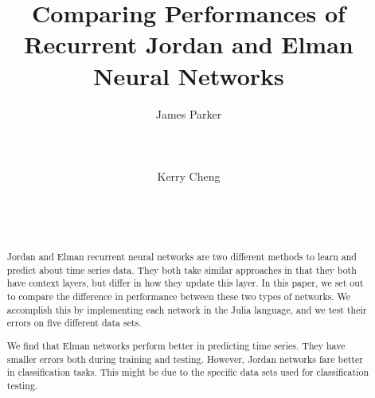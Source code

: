 \documentclass{acm_proc_article-sp}
\begin{document}
\title{Comparing Performances of Recurrent Jordan and Elman Neural Networks}
\author{
\alignauthor James Parker\\%
       \\
       \\
       \\
\alignauthor Kerry Cheng\\%
       \\
       \\
       \\
}

\maketitle

\begin{abstract}
Jordan and Elman recurrent neural networks are two different methods to learn and predict about time series data. 
They both take similar approaches in that they both have context layers, but differ in how they update this layer. 
In this paper, we set out to compare the difference in performance between these two types of networks. %
We accomplish this by implementing each network in the Julia language, and we test their errors on five different data sets. 

We find that Elman networks perform better in predicting time series.
They have smaller errors both during training and testing.
However, Jordan networks fare better in classification tasks.
This might be due to the specific data sets used for classification testing.
\end{abstract}
\end{document}
